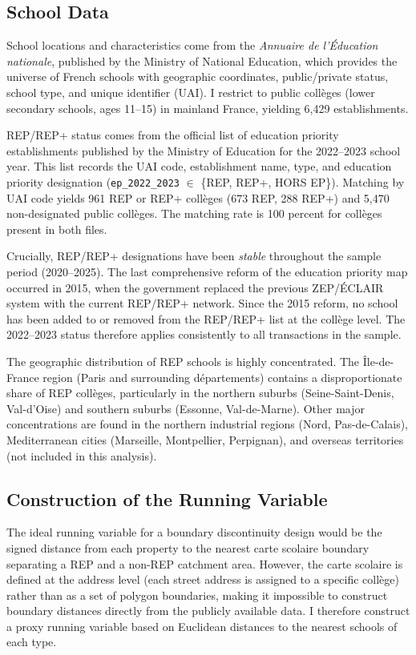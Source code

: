 \documentclass[12pt]{article}
\begin{document}
\subsection{School Data}

School locations and characteristics come from the \textit{Annuaire de l'\'{E}ducation nationale}, published by the Ministry of National Education, which provides the universe of French schools with geographic coordinates, public/private status, school type, and unique identifier (UAI). I restrict to public coll\`{e}ges (lower secondary schools, ages 11--15) in mainland France, yielding 6,429 establishments.

REP/REP+ status comes from the official list of education priority establishments published by the Ministry of Education for the 2022--2023 school year. This list records the UAI code, establishment name, type, and education priority designation (\texttt{ep\_2022\_2023} $\in$ \{REP, REP+, HORS EP\}). Matching by UAI code yields 961 REP or REP+ coll\`{e}ges (673 REP, 288 REP+) and 5,470 non-designated public coll\`{e}ges. The matching rate is 100 percent for coll\`{e}ges present in both files.

Crucially, REP/REP+ designations have been \textit{stable} throughout the sample period (2020--2025). The last comprehensive reform of the education priority map occurred in 2015, when the government replaced the previous ZEP/\'{E}CLAIR system with the current REP/REP+ network. Since the 2015 reform, no school has been added to or removed from the REP/REP+ list at the coll\`{e}ge level. The 2022--2023 status therefore applies consistently to all transactions in the sample.

The geographic distribution of REP schools is highly concentrated. The \^{I}le-de-France region (Paris and surrounding d\'{e}partements) contains a disproportionate share of REP coll\`{e}ges, particularly in the northern suburbs (Seine-Saint-Denis, Val-d'Oise) and southern suburbs (Essonne, Val-de-Marne). Other major concentrations are found in the northern industrial regions (Nord, Pas-de-Calais), Mediterranean cities (Marseille, Montpellier, Perpignan), and overseas territories (not included in this analysis).

\subsection{Construction of the Running Variable}

The ideal running variable for a boundary discontinuity design would be the signed distance from each property to the nearest carte scolaire boundary separating a REP and a non-REP catchment area. However, the carte scolaire is defined at the address level (each street address is assigned to a specific coll\`{e}ge) rather than as a set of polygon boundaries, making it impossible to construct boundary distances directly from the publicly available data. I therefore construct a proxy running variable based on Euclidean distances to the nearest schools of each type.
\end{document}
